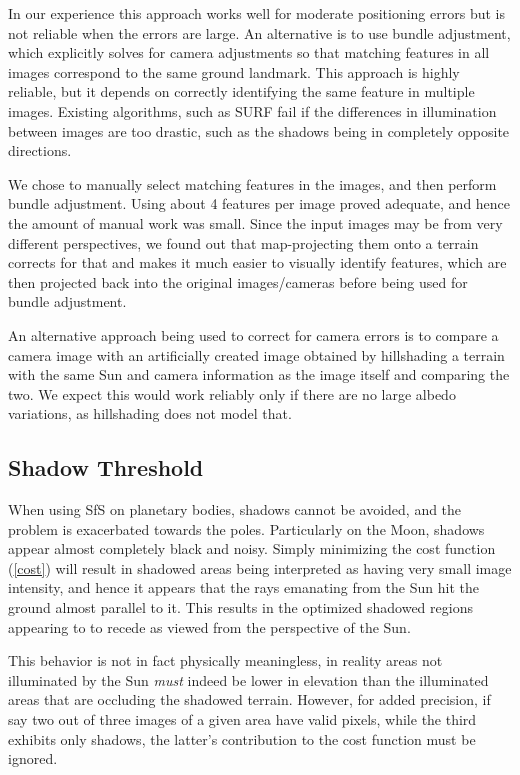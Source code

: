 \documentclass[12pt,oneside]{article}
\begin{document}
In our experience this approach works well for moderate positioning errors but is not 
reliable when the errors are large. An alternative is to use bundle adjustment,
which explicitly solves for camera adjustments so that matching features in
all images correspond to the same ground landmark. This approach is highly 
reliable, but it depends on correctly identifying the same feature in multiple images.
Existing algorithms, such as SURF fail if the differences in illumination between
images are too drastic, such as the shadows being in completely opposite directions.

We chose to manually select matching features in the images, and then perform
bundle adjustment. Using about 4 features per image proved adequate, and hence
the amount of manual work was small. Since the input images may be from very different
perspectives, we found out that map-projecting them onto a terrain corrects for that
and makes it much easier to visually identify features, which are then projected
back into the original images/cameras before being used for bundle adjustment.

An alternative approach being used to correct for camera errors is to compare a 
camera image with an artificially created image obtained by hillshading a terrain
with the same Sun and camera information as the image itself and comparing the two.
We expect this would work reliably only if there are no large albedo variations,
as hillshading does not model that. 

\subsection{Shadow Threshold}
\label{shadow}

When using SfS on planetary bodies, shadows cannot be avoided, and the
problem is exacerbated towards the poles. Particularly on the Moon,
shadows appear almost completely black and noisy. Simply minimizing the
cost function (\ref{cost}) will result in shadowed areas being
interpreted as having very small image intensity, and hence it appears
that the rays emanating from the Sun hit the ground almost parallel to
it. This results in the optimized shadowed regions appearing to to
recede as viewed from the perspective of the Sun.

This behavior is not in fact physically meaningless, in reality areas
not illuminated by the Sun \textit{must} indeed be lower in elevation
than the illuminated areas that are occluding the shadowed terrain.
However, for added precision, if say two out of three images of a given
area have valid pixels, while the third exhibits only shadows, the
latter's contribution to the cost function must be ignored.
\end{document}
